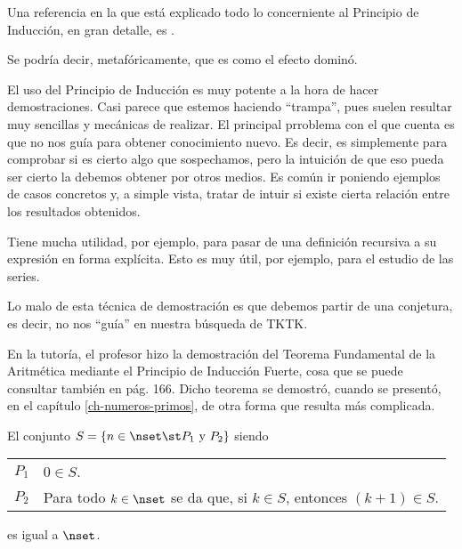 



Una referencia en la que está explicado todo lo concerniente al Principio de
Inducción, en gran detalle, es \cite{idescent-newstead}.

Se podría decir, metafóricamente, que es como el efecto dominó.

El uso del Principio de Inducción es muy potente a la hora de hacer
demostraciones. Casi parece que estemos haciendo ``trampa'', pues suelen
resultar muy sencillas y mecánicas de realizar. El principal prroblema con
el que cuenta es que no nos guía para obtener conocimiento nuevo. Es decir,
es simplemente para comprobar si es cierto algo que sospechamos, pero la
intuición de que eso pueda ser cierto la debemos obtener por otros medios.
Es común ir poniendo ejemplos de casos concretos y, a simple vista, tratar
de intuir si existe cierta relación entre los resultados obtenidos.


Tiene mucha utilidad, por ejemplo, para pasar de una definición recursiva a
su expresión en forma explícita. Esto es muy útil, por ejemplo, para el
estudio de las series.



Lo malo de esta técnica de demostración es que debemos partir de una
conjetura, es decir, no nos ``guía'' en nuestra búsqueda de TKTK.







En la tutoría, el profesor hizo la demostración del Teorema Fundamental de
la Aritmética mediante el Principio de Inducción Fuerte, cosa que se puede
consultar también en \cite{proofs-cummings} pág. 166. Dicho teorema se
demostró, cuando se presentó, en el capítulo \ref{ch-numeros-primos}, de
otra forma que resulta más complicada.




\begin{theorem}\label{princ-induccion}
  El conjunto $S = \{n \in \nset \st P_1 \ \text{y} \ P_2\}$ siendo

  \begin{center}
    \begin{tabular}{l p{}}
      $P_1$ & $0 \in S$. \\
      $P_2$ & Para todo $k \in \nset$ se da que, si $k \in S$, entonces
        $(k+1) \in S$.
    \end{tabular}
  \end{center}

  \noindent es igual a $\nset$.
\end{theorem}

